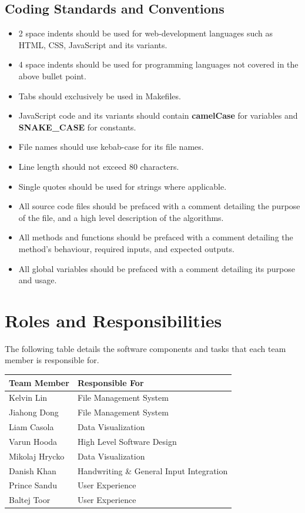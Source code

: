 \documentclass{article}
\begin{document}
\subsection{Coding Standards and Conventions}
\label{sec:code-standards}
\begin{itemize}
\item 2 space indents should be used for web-development languages such as HTML, CSS, JavaScript and its variants.
\item 4 space indents should be used for programming languages not covered in the above bullet point.
\item Tabs should exclusively be used in Makefiles.
\item JavaScript code and its variants should contain \textbf{camelCase} for variables and \textbf{SNAKE\_CASE} for constants.
\item File names should use kebab-case for its file names.
\item Line length should not exceed 80 characters.
\item Single quotes should be used for strings where applicable.
\item All source code files should be prefaced with a comment detailing the purpose of the file, and a high level description of the algorithms.
\item All methods and functions should be prefaced with a comment detailing the method's behaviour, required inputs, and expected outputs.
\item All global variables should be prefaced with a comment detailing its purpose and usage.
\end{itemize}

\section{Roles and Responsibilities}
\label{sec:roles-responsibilities}
The following table details the software components and tasks that each team member is responsible for.
\begin{table}[H]
\begin{tabular}{|l|l|}
\hline
\textbf{Team Member} & \textbf{Responsible For}                 \\ \hline
Kelvin Lin           & File Management System                   \\ \hline
Jiahong Dong         & File Management System                   \\ \hline
Liam Casola          & Data Visualization                       \\ \hline
Varun Hooda          & High Level Software Design               \\ \hline
Mikolaj Hrycko       & Data Visualization                       \\ \hline
Danish Khan          & Handwriting \& General Input Integration \\ \hline
Prince Sandu         & User Experience                          \\ \hline
Baltej Toor          & User Experience                          \\ \hline
\end{tabular}
\end{table}
\end{document}
